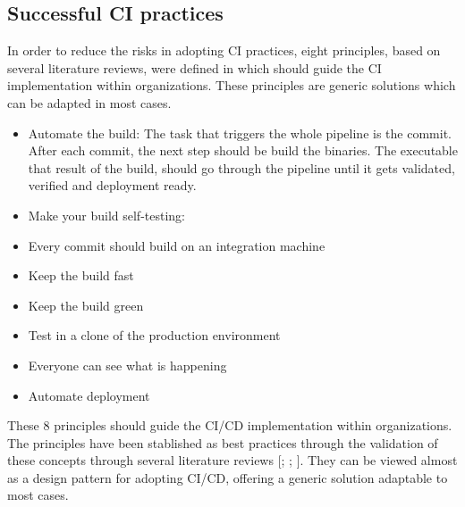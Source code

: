 \subsection{Successful CI practices}
\label{ci-successful-pract}

In order to reduce the risks in adopting CI practices, eight principles, based on several literature reviews, were defined in \cite{Rejstrom2016} which should guide the CI implementation within organizations. These principles are generic solutions which can be adapted in most cases.

\begin{itemize}
\item Automate the build: The task that triggers the whole pipeline is the commit. After each commit, the next step should be build the binaries. The executable that result of the build, should go through the pipeline until it gets validated, verified and deployment ready.
\item Make your build self-testing: 
\item Every commit should build on an integration machine
\item Keep the build fast
\item Keep the build green
\item Test in a clone of the production environment
\item Everyone can see what is happening
\item Automate deployment
\end{itemize}

These 8 principles should guide the CI/CD implementation within organizations. The principles have been stablished as best practices through the validation of these concepts through several literature reviews [\cite{Rodriguez2016}; \cite{Mantyla2015}; \cite{Stahl2014}]. They can be viewed almost as a design pattern for adopting CI/CD, offering a generic solution adaptable to most cases.